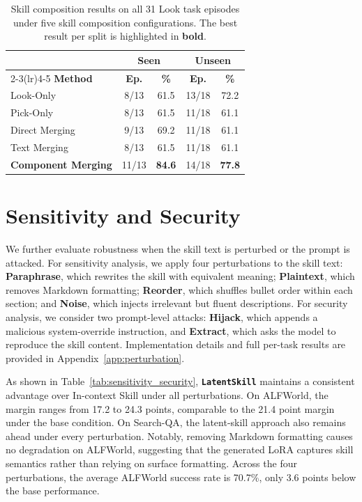\documentclass{llmxive}
\providecommand{\best}[1]{\textbf{#1}}
\providecommand{\textttt}[1]{\texttt{#1}}
\providecommand{\method}{\textbf{\textttt{LatentSkill}}}
\providecommand{\arraystretch}{1.05}
\begin{document}
\begin{table}[t]
\centering
\small
\setlength{\tabcolsep}{5pt}
\renewcommand{\arraystretch}{1.1}
\begin{tabular}{l cc cc}
\toprule
& \multicolumn{2}{c}{\textbf{Seen}}
& \multicolumn{2}{c}{\textbf{Unseen}} \\
\cmidrule(lr){2-3}\cmidrule(lr){4-5}
\textbf{Method}
  & \textbf{Ep.} & \textbf{\%}
  & \textbf{Ep.} & \textbf{\%} \\
\midrule
Look-Only      & 8/13  & 61.5        & 13/18 & 72.2 \\
Pick-Only      & 8/13  & 61.5        & 11/18 & 61.1 \\
\midrule
Direct Merging & 9/13  & 69.2        & 11/18 & 61.1 \\
Text Merging   & 8/13  & 61.5        & 11/18 & 61.1 \\
\rowcolor{ourblue}
\textbf{Component Merging} & 11/13 & \best{84.6} & 14/18 & \best{77.8} \\
\bottomrule
\end{tabular}
\caption{
  Skill composition results on all 31 Look task episodes under five skill
composition configurations. The best result per split is highlighted in \textbf{bold}.
}
\label{tab:compose}
\end{table}

\section{Sensitivity and Security}
We further evaluate robustness when the skill text is perturbed or the prompt is attacked. For sensitivity analysis, we apply four perturbations to the skill text: \textbf{Paraphrase}, which rewrites the skill with equivalent meaning; \textbf{Plaintext}, which removes Markdown formatting; \textbf{Reorder}, which shuffles bullet order within each section; and \textbf{Noise}, which injects irrelevant but fluent descriptions. For security analysis, we consider two prompt-level attacks: \textbf{Hijack}, which appends a malicious system-override instruction, and \textbf{Extract}, which asks the model to reproduce the skill content. Implementation details and full per-task results are provided in Appendix~\ref{app:perturbation}.

As shown in Table~\ref{tab:sensitivity_security}, \method{} maintains a consistent advantage over In-context Skill under all perturbations. On ALFWorld, the margin ranges from 17.2 to 24.3 points, comparable to the 21.4 point margin under the base condition. On Search-QA, the latent-skill approach also remains ahead under every perturbation. Notably, removing Markdown formatting causes no degradation on ALFWorld, suggesting that the generated LoRA captures skill semantics rather than relying on surface formatting. Across the four perturbations, the average ALFWorld success rate is 70.7\%, only 3.6 points below the base performance.
\end{document}
